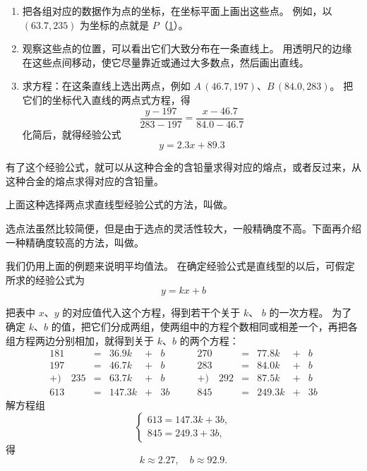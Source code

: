 \begin{solution}
  \begin{enumerate}
    \item 把各组对应的数据作为点的坐标，在坐标平面上画出这些点。
    例如，以 $(63.7,235)$ 为坐标的点就是 $P$（\cref{fig:1-28}）。
    \item 观察这些点的位置，可以看出它们大致分布在一条直线上。
    用透明尺的边缘在这些点间移动，使它尽量靠近或通过大多数点，然后画出直线。
    \item 求方程：在这条直线上选出两点，例如 $A\,(46.7,197)$、$B\,(84.0,283)$。
    把它们的坐标代入直线的两点式方程，得
    \[ \frac{y-197}{283-197}=\frac{x-46.7}{84.0-46.7}\]
    化简后，就得经验公式
    \[ y=2.3x+89.3\]
  \end{enumerate}

  有了这个经验公式，就可以从这种合金的含铅量求得对应的熔点，或者反过来，从这种合金的熔点求得对应的含铅量。
\end{solution}
\begin{figure}
  \caption{}\label{fig:1-28}
\end{figure}


上面这种选择两点求直线型经验公式的方法，叫做。

选点法虽然比较简便，但是由于选点的灵活性较大，一般精确度不高。下面再介绍一种精确度较高的方法，叫做。

我们仍用上面的例题来说明平均值法。
在确定经验公式是直线型的以后，可假定所求的经验公式为
\[y=kx+b\]

把表中 $x$、$y$ 的对应值代入这个方程，得到若干个关于 $k$、 $b$ 的一次方程。
为了确定 $k$、$b$ 的值，把它们分成两组，使两组中的方程个数相同或相差一个，再把各组方程两边分别相加，就得到关于 $k$、$b$ 的两个方程：
\[ 
  \begin{array}{rcrcr}
      181 &=& 36.9k&+&b \\
      197 &=& 46.7k&+&b \\
   +)\quad 235 &=& 63.7k&+&b \\
   \hline 
    613 &=& 147.3k&{}+&3b 
  \end{array}\qquad 
  \begin{array}{rcrcr}
    270 &=& 77.8k&+&b \\
    283 &=& 84.0k&+&b \\
 +)\quad 292 &=& 87.5k&+&b \\
 \hline 
  845 &=& 249.3k&{}+&3b 
\end{array}
\]
解方程组
\[ \begin{cases} 
  613=147.3k+3b,\\
  845=249.3+3b,
\end{cases}\]
得
\[ k\approx 2.27,\quad b\approx 92.9.\]


